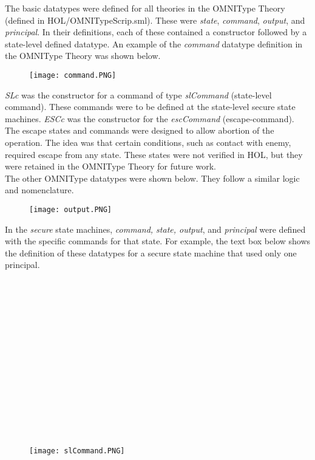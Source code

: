 The basic datatypes were defined for all theories in the OMNIType Theory (defined in HOL/OMNITypeScrip.sml).  These were \emph{state}, \emph{command}, \emph{output}, and \emph{principal}.   In their definitions, each of these contained a constructor followed by a state-level defined datatype.   An example of the \emph{command} datatype definition in the OMNIType Theory was shown below.\\
  
  \begin{figure}[h]
  \centering
  \texttt{[image: command.PNG]}
\end{figure}

  \emph{SLc} was the constructor for a command of type \emph{slCommand} (state-level command).  These commands were to be defined at the state-level secure state machines. \emph{ESCc} was the constructor for the  \emph{escCommand} (escape-command).  The escape states and commands were designed to allow abortion of the operation.  The idea was that certain conditions, such as contact with enemy, required escape from any state.  These states were not verified in HOL, but they were retained in the OMNIType Theory for future work. \\
  
   The other OMNIType datatypes were shown below.  They follow a similar logic and nomenclature. \\
  
  \begin{figure}[h]
  \centering
  \texttt{[image: output.PNG]}
\end{figure}

  In the \emph{secure} state machines, \emph{command, state, output}, and \emph{principal} were defined with the specific commands for that state.  For example, the text box below shows the definition of these datatypes for a secure state machine that used only one principal. \\\\\\\\\\\\\\\\\\\\\\\\\\\\\\
  \begin{figure}[h]
  \centering
  \texttt{[image: slCommand.PNG]}
\end{figure}

